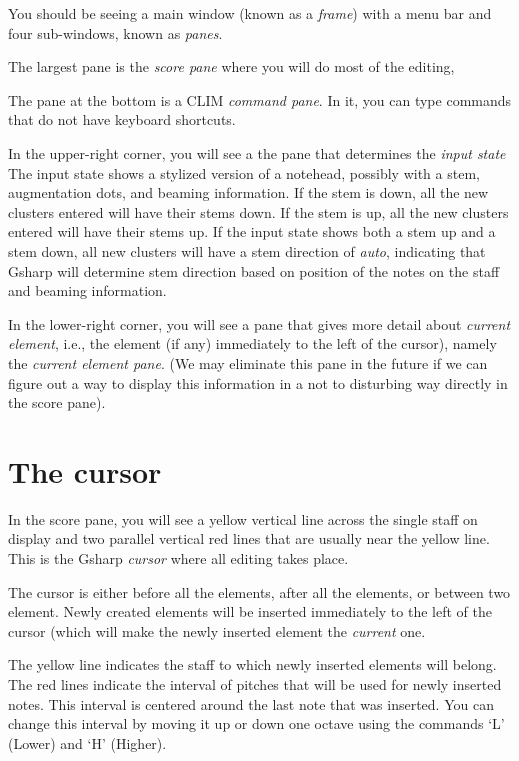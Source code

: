 \documentclass[11pt]{book}
\def\gs{Gsharp}
\def\clim{CLIM}
\def\kbd#1{`#1'}
\begin{document}
You should be seeing a main window (known as a \emph{frame}) with a
menu bar and four sub-windows, known as \emph{panes}.  

The largest pane is the \emph{score pane} where you will do most of the editing, 

The pane at the bottom is a {\clim} \emph{command pane}.  In it, you can type
commands that do not have keyboard shortcuts.

In the upper-right corner, you will see a the pane that determines the
\emph{input state}
The input state shows a stylized version of a notehead, possibly with
a stem, augmentation dots, and beaming information.  If the stem is
down, all the new clusters entered will have their stems down.  If the
stem is up, all the new clusters entered will have their stems up.  If
the input state shows both a stem up and a stem down, all new
clusters will have a stem direction of \emph{auto}, indicating that
{\gs} will determine stem direction based on position of the notes on
the staff and beaming information. 

In the lower-right corner, you will see a pane that gives more detail
about \emph{current element}, i.e., the element (if any)
immediately to the left of the cursor), namely the \emph{current
  element pane}. (We may eliminate this pane in the
future if we can figure out a way to display this information in a not
to disturbing way directly in the score pane).

\section{The cursor}

In the score pane, you will see a yellow vertical line across the
single staff on display and two parallel vertical red lines that are
usually near the yellow line.  This is the {\gs}
\emph{cursor} where all editing takes place.

The cursor is either before all the elements, after all the elements,
or between two element.  Newly created elements will be inserted
immediately to the left of the cursor (which will make the newly
inserted element the \emph{current} one. 

The yellow line indicates the staff to which newly inserted elements
will belong.  The red lines indicate the interval of pitches that will
be used for newly inserted notes.  This interval is centered around
the last note that was inserted.  You can change this interval by
moving it up or down one octave using the commands \kbd{L} (Lower) and
\kbd{H} (Higher). 
\end{document}
